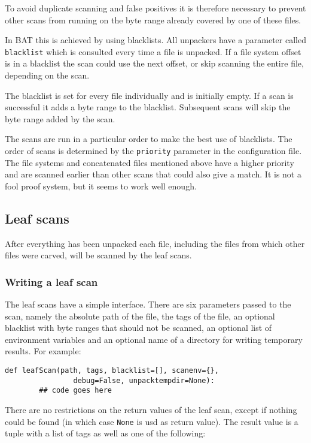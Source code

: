 \documentclass[10pt]{article}
\begin{document}
To avoid duplicate scanning and false positives it is therefore necessary to
prevent other scans from running on the byte range already covered by one of
these files.

In BAT this is achieved by using blacklists. All unpackers have a parameter
called \texttt{blacklist} which is consulted every time a file is unpacked. If
a file system offset is in a blacklist the scan could use the next offset, or
skip scanning the entire file, depending on the scan.

The blacklist is set for every file individually and is initially empty. If a
scan is successful it adds a byte range to the blacklist. Subsequent scans
will skip the byte range added by the scan.

The scans are run in a particular order to make the best use of blacklists. The
order of scans is determined by the \texttt{priority} parameter in the
configuration file. The file systems and concatenated files mentioned above
have a higher priority and are scanned earlier than other scans that could also
give a match. It is not a fool proof system, but it seems to work well enough.

\subsection{Leaf scans}

After everything has been unpacked each file, including the files from which
other files were carved, will be scanned by the leaf scans.

\subsubsection{Writing a leaf scan}

The leaf scans have a simple interface. There are six parameters passed to the
scan, namely the absolute path of the file, the tags of the file, an optional
blacklist with byte ranges that should not be scanned, an optional list of
environment variables and an optional name of a directory for writing temporary
results. For example:

\begin{verbatim}
def leafScan(path, tags, blacklist=[], scanenv={},
                debug=False, unpacktempdir=None):
        ## code goes here
\end{verbatim}

There are no restrictions on the return values of the leaf scan, except if
nothing could be found (in which case \texttt{None} is usd as return value).
The result value is a tuple with a list of tags as well as one of the following:
\end{document}
